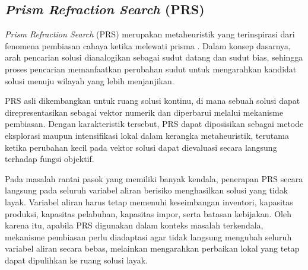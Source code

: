\documentclass{file/TA-ITS}
\theoremstyle{definition}
\theoremstyle{definition}
\theoremstyle{plain}
\begin{document}
\subsection{\textit{Prism Refraction Search} (PRS)}

\textit{Prism Refraction Search} (PRS) merupakan metaheuristik yang terinspirasi dari fenomena pembiasan cahaya ketika melewati prisma \cite{kundu2024prism}. Dalam konsep dasarnya, arah pencarian solusi dianalogikan sebagai sudut datang dan sudut bias, sehingga proses pencarian memanfaatkan perubahan sudut untuk mengarahkan kandidat solusi menuju wilayah yang lebih menjanjikan.

PRS asli dikembangkan untuk ruang solusi kontinu, di mana sebuah solusi dapat direpresentasikan sebagai vektor numerik dan diperbarui melalui mekanisme pembiasan. Dengan karakteristik tersebut, PRS dapat diposisikan sebagai metode eksplorasi maupun intensifikasi lokal dalam kerangka metaheuristik, terutama ketika perubahan kecil pada vektor solusi dapat dievaluasi secara langsung terhadap fungsi objektif.

Pada masalah rantai pasok yang memiliki banyak kendala, penerapan PRS secara langsung pada seluruh variabel aliran berisiko menghasilkan solusi yang tidak layak. Variabel aliran harus tetap memenuhi keseimbangan inventori, kapasitas produksi, kapasitas pelabuhan, kapasitas impor, serta batasan kebijakan. Oleh karena itu, apabila PRS digunakan dalam konteks masalah terkendala, mekanisme pembiasan perlu diadaptasi agar tidak langsung mengubah seluruh variabel aliran secara bebas, melainkan mengarahkan perbaikan lokal yang tetap dapat dipulihkan ke ruang solusi layak.







\end{document}
